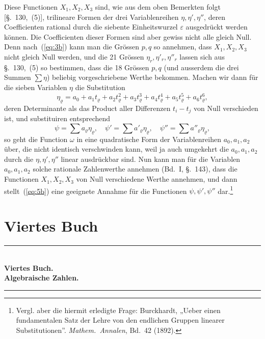 \documentclass[12pt,a4paper]{article}
\theoremstyle{definition}
\begin{document}
Diese Functionen $X_1,X_2,X_3$ sind, wie aus dem oben Bemerkten folgt [\S.~130,~(5)], trilineare Formen der drei Variablenreihen $\eta,\eta',\eta''$, deren Coefficienten rational durch die siebente Einheitswurzel $\varepsilon$ ausgedrückt werden können. Die Coefficienten dieser Formen sind aber gewiss nicht alle gleich Null. Denn nach~(\ref{eq:3b}) kann man die Grössen $p,q$ so annehmen, dass $X_1,X_2,X_3$ nicht gleich Null werden, und die 21 Grössen $\eta_r,\eta'_r,\eta''_r$ lassen sich aus \S.~130,~(5) so bestimmen, dass die 18 Grössen $p,q$ (und ausserdem die drei Summen $\sum\eta$) beliebig vorgeschriebene Werthe bekommen. Machen wir dann für die sieben Variablen $\eta$ die Substitution
\begin{equation}\label{eq:4b}
\eta_\varrho = a_0 + a_1 t_\varrho + a_2 t_\varrho^2 + a_3 t_\varrho^3 + a_4 t_\varrho^4 + a_5 t_\varrho^5 + a_6 t_\varrho^6,
\end{equation}
deren Determinante als das Product aller Differenzen $t_i-t_j$ von Null verschieden ist, und substituiren entsprechend
\begin{equation}\label{eq:5b}
\psi = \sum a_\varrho \eta_\varrho,\quad
\psi' = \sum a'_\varrho \eta_\varrho,\quad
\psi'' = \sum a''_\varrho \eta_\varrho,
\end{equation}
so geht die Function $\omega$ in eine quadratische Form der Variablenreihen $a_0,a_1,a_2$ über, die nicht identisch verschwinden kann, weil ja auch umgekehrt die $a_0,a_1,a_2$ durch die $\eta,\eta',\eta''$ linear ausdrückbar sind. Nun kann man für die Variablen $a_0,a_1,a_2$ solche rationale Zahlenwerthe annehmen (Bd.~I, \S.~143), dass die Functionen $X_1,X_2,X_3$ von Null verschiedene Werthe annehmen, und dann stellt~(\ref{eq:5b}) eine geeignete Annahme für die Functionen $\psi,\psi',\psi''$ dar.\footnote{Vergl. aber die hiermit erledigte Frage: Burckhardt, „Ueber einen fundamentalen Satz der Lehre von den endlichen Gruppen linearer Substitutionen''. \textit{Mathem.\ Annalen}, Bd.~42 (1892).}

\newpage
\part*{Viertes Buch}%

\begin{center}
\rule{0.6\textwidth}{0.4pt}\\[1.5em]
{\Huge\bfseries Viertes Buch.}\\[1em]
{\LARGE\bfseries Algebraische Zahlen.}\\[1.5em]
\rule{0.6\textwidth}{0.4pt}
\end{center}
\end{document}
